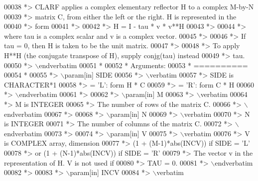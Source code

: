 \begin{DoxyCode}
00038 \textcolor{comment}{*> CLARF applies a complex elementary reflector H to a complex M-by-N}
00039 \textcolor{comment}{*> matrix C, from either the left or the right. H is represented in the}
00040 \textcolor{comment}{*> form}
00041 \textcolor{comment}{*>}
00042 \textcolor{comment}{*>       H = I - tau * v * v**H}
00043 \textcolor{comment}{*>}
00044 \textcolor{comment}{*> where tau is a complex scalar and v is a complex vector.}
00045 \textcolor{comment}{*>}
00046 \textcolor{comment}{*> If tau = 0, then H is taken to be the unit matrix.}
00047 \textcolor{comment}{*>}
00048 \textcolor{comment}{*> To apply H**H (the conjugate transpose of H), supply conjg(tau) instead}
00049 \textcolor{comment}{*> tau.}
00050 \textcolor{comment}{*> \(\backslash\)endverbatim}
00051 \textcolor{comment}{*}
00052 \textcolor{comment}{*  Arguments:}
00053 \textcolor{comment}{*  ==========}
00054 \textcolor{comment}{*}
00055 \textcolor{comment}{*> \(\backslash\)param[in] SIDE}
00056 \textcolor{comment}{*> \(\backslash\)verbatim}
00057 \textcolor{comment}{*>          SIDE is CHARACTER*1}
00058 \textcolor{comment}{*>          = 'L': form  H * C}
00059 \textcolor{comment}{*>          = 'R': form  C * H}
00060 \textcolor{comment}{*> \(\backslash\)endverbatim}
00061 \textcolor{comment}{*>}
00062 \textcolor{comment}{*> \(\backslash\)param[in] M}
00063 \textcolor{comment}{*> \(\backslash\)verbatim}
00064 \textcolor{comment}{*>          M is INTEGER}
00065 \textcolor{comment}{*>          The number of rows of the matrix C.}
00066 \textcolor{comment}{*> \(\backslash\)endverbatim}
00067 \textcolor{comment}{*>}
00068 \textcolor{comment}{*> \(\backslash\)param[in] N}
00069 \textcolor{comment}{*> \(\backslash\)verbatim}
00070 \textcolor{comment}{*>          N is INTEGER}
00071 \textcolor{comment}{*>          The number of columns of the matrix C.}
00072 \textcolor{comment}{*> \(\backslash\)endverbatim}
00073 \textcolor{comment}{*>}
00074 \textcolor{comment}{*> \(\backslash\)param[in] V}
00075 \textcolor{comment}{*> \(\backslash\)verbatim}
00076 \textcolor{comment}{*>          V is COMPLEX array, dimension}
00077 \textcolor{comment}{*>                     (1 + (M-1)*abs(INCV)) if SIDE = 'L'}
00078 \textcolor{comment}{*>                  or (1 + (N-1)*abs(INCV)) if SIDE = 'R'}
00079 \textcolor{comment}{*>          The vector v in the representation of H. V is not used if}
00080 \textcolor{comment}{*>          TAU = 0.}
00081 \textcolor{comment}{*> \(\backslash\)endverbatim}
00082 \textcolor{comment}{*>}
00083 \textcolor{comment}{*> \(\backslash\)param[in] INCV}
00084 \textcolor{comment}{*> \(\backslash\)verbatim}

\end{DoxyCode}

